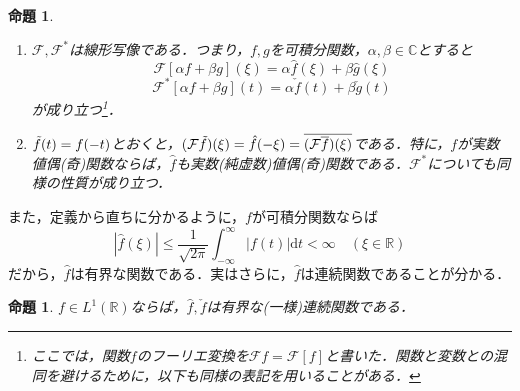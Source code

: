 \documentclass[a4j]{jsbook}
\newtheorem{prop}[theorem]{命題}
\numberwithin{theorem}{chapter}  %
\begin{document}
\begin{prop}
\label{prop3-1}
\begin{enumerate}
    \renewcommand{\labelenumi}{(\roman{enumi})}
    \item \(\mathcal{F}, \mathcal{F}^*\)は線形写像である．つまり，\(f, g\)を可積分関数，\(\alpha, \beta\in\mathbb{C}\)とすると
    \begin{equation*}
        \mathcal{F}[\alpha f+\beta g](\xi)=\alpha\hat{f}(\xi)+\beta\hat{g}(\xi)
    \end{equation*}
    \begin{equation*}
        \mathcal{F}^*[\alpha f+\beta g](t)=\alpha\check{f}(t)+\beta\check{g}(t)
    \end{equation*}
    が成り立つ\footnote{ここでは，関数\(f\)のフーリエ変換を\(\mathcal{F}f=\mathcal{F}[f]\)と書いた．関数と変数との混同を避けるために，以下も同様の表記を用いることがある．}．
    \item \(\Tilde{f}(t)=f(-t)\)とおくと，\((\mathcal{F}\Tilde{f})(\xi)=\hat{f}(-\xi)=\overline{(\mathcal{F}\overline{f})(\xi)}\)である．特に，\(f\)が実数値偶(奇)関数ならば，\(\hat{f}\)も実数(純虚数)値偶(奇)関数である．\(\mathcal{F}^*\)についても同様の性質が成り立つ．
\end{enumerate}
\end{prop}
また，定義から直ちに分かるように，\(f\)が可積分関数ならば
\begin{equation*}
    \left|\hat{f}(\xi)\right|\leq\frac{1}{\sqrt{2\pi}}\int_{-\infty}^\infty |f(t)|\mathrm{d}t<\infty\quad (\xi\in\mathbb{R})
\end{equation*}
だから，\(\hat{f}\)は有界な関数である．実はさらに，\(\hat{f}\)は連続関数であることが分かる．
\begin{prop}
\label{prop3-2}
\(f\in L^1(\mathbb{R})\)ならば，\(\hat{f}, \check{f}\)は有界な(一様)連続関数である．
\end{prop}
\end{document}
